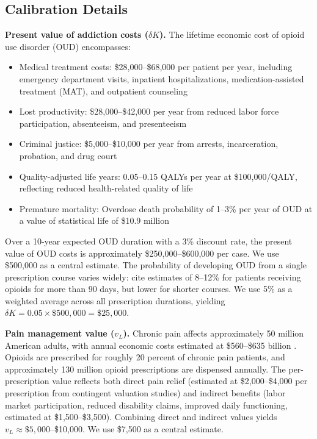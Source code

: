 \documentclass[12pt]{article}
\begin{document}
\subsection{Calibration Details}

\textbf{Present value of addiction costs ($\delta K$).} The lifetime economic cost of opioid use disorder (OUD) encompasses:
\begin{itemize}
\item Medical treatment costs: \$28,000--\$68,000 per patient per year, including emergency department visits, inpatient hospitalizations, medication-assisted treatment (MAT), and outpatient counseling \citep{florence2021economic}
\item Lost productivity: \$28,000--\$42,000 per year from reduced labor force participation, absenteeism, and presenteeism
\item Criminal justice: \$5,000--\$10,000 per year from arrests, incarceration, probation, and drug court
\item Quality-adjusted life years: 0.05--0.15 QALYs per year at \$100,000/QALY, reflecting reduced health-related quality of life
\item Premature mortality: Overdose death probability of 1--3\% per year of OUD at a value of statistical life of \$10.9 million
\end{itemize}

Over a 10-year expected OUD duration with a 3\% discount rate, the present value of OUD costs is approximately \$250,000--\$600,000 per case. We use \$500,000 as a central estimate. The probability of developing OUD from a single prescription course varies widely: \citet{volkow2016opioid} cite estimates of 8--12\% for patients receiving opioids for more than 90 days, but lower for shorter courses. We use 5\% as a weighted average across all prescription durations, yielding $\delta K = 0.05 \times \$500{,}000 = \$25{,}000$.

\textbf{Pain management value ($v_L$).} Chronic pain affects approximately 50 million American adults, with annual economic costs estimated at \$560--\$635 billion \citep{florence2016economic}. Opioids are prescribed for roughly 20 percent of chronic pain patients, and approximately 130 million opioid prescriptions are dispensed annually. The per-prescription value reflects both direct pain relief (estimated at \$2,000--\$4,000 per prescription from contingent valuation studies) and indirect benefits (labor market participation, reduced disability claims, improved daily functioning, estimated at \$1,500--\$3,500). Combining direct and indirect values yields $v_L \approx \$5{,}000$--\$10{,}000. We use \$7,500 as a central estimate.
\end{document}

